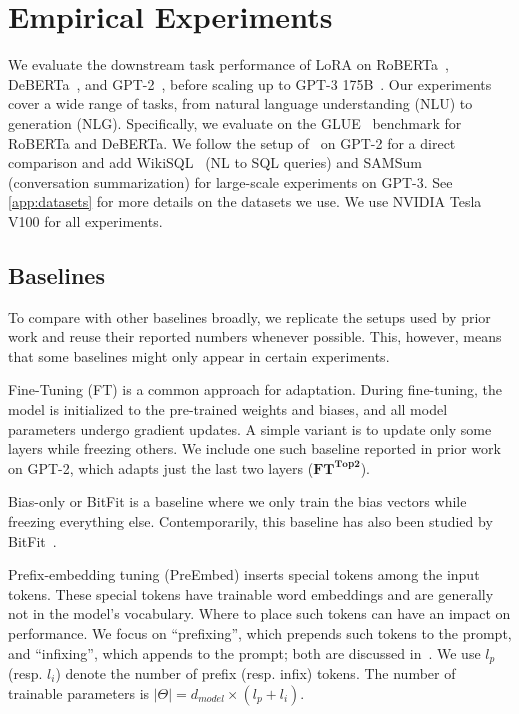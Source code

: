 \documentclass{article} %
\begin{document}
\section{Empirical Experiments}
\label{sec:empirical}
We evaluate the downstream task performance of LoRA on RoBERTa~\citep{liu2019roberta}, DeBERTa~\citep{he2021deberta}, and GPT-2~\citep{radford_language_nodate}, before scaling up to GPT-3 175B~\citep{brown_language_2020}.
Our experiments cover a wide range of tasks, from natural language understanding (NLU) to generation (NLG).
Specifically, we evaluate on the GLUE~\citep{wang2019glue} benchmark for RoBERTa and DeBERTa.
We follow the setup of~\citet{li_prefix-tuning_2021} on GPT-2 for a direct comparison and add WikiSQL~\citep{DBLP:journals/corr/abs-1709-00103} (NL to SQL queries) and SAMSum~\citep{DBLP:journals/corr/abs-1911-12237} (conversation summarization) for large-scale experiments on GPT-3.
See \autoref{app:datasets} for more details on the datasets we use.
We use NVIDIA Tesla V100 for all experiments.

\subsection{Baselines}
\label{sec:expt_baselines}
To compare with other baselines broadly, we replicate the setups used by prior work and reuse their reported numbers whenever possible.
This, however, means that some baselines might only appear in certain experiments.

Fine-Tuning (FT) is a common approach for adaptation.
During fine-tuning, the model is initialized to the pre-trained weights and biases, and all model parameters undergo gradient updates.%
A simple variant is to update only some layers while freezing others.
We include one such baseline reported in prior work~\citep{li_prefix-tuning_2021} on GPT-2, which adapts just the last two layers ($\textbf{FT}^{\textbf{Top2}}$).

Bias-only or BitFit is a baseline where we only train the bias vectors while freezing everything else.
Contemporarily, this baseline has also been studied by BitFit~\citep{zaken2021bitfit}.

Prefix-embedding tuning (PreEmbed) inserts special tokens among the input tokens.
These special tokens have trainable word embeddings and are generally not in the model's vocabulary.
Where to place such tokens can have an impact on performance.
We focus on ``prefixing'', which prepends such tokens to the prompt, and ``infixing'', which appends to the prompt; both are discussed in~\citet{li_prefix-tuning_2021}.
We use $l_{p}$ (resp. $l_{i}$) denote the number of prefix (resp. infix) tokens.
The number of trainable parameters is $|\Theta| = d_{model} \times (l_p + l_i)$.
\end{document}
